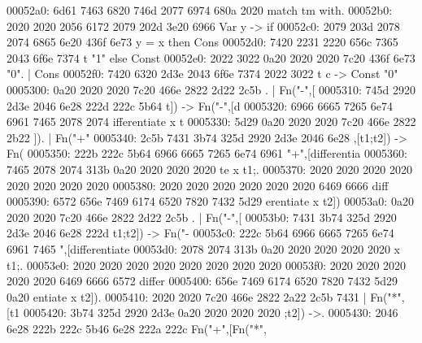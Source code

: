 \begin{bo
00010e0: 7865 647d 5c62 6567 696e 7b76 6572 6261  xed}
\begin{verba
00010f0: 7469 6d7d 0a20 2023 7479 7065 2074 6572  tim}
\begin{
0001c40: 7665 7262 6174 696d 7d0a 2020 236c 6574  verbatim}
\begin{boxe
00027a0: 647d 5c62 6567 696e 7b76 6572 6261 7469  d}
\begin{verbati
00027b0: 6d7d 0a20 2023 6c65 7420 696e 6669 7865  m}
\begin{v
0002c60: 6572 6261 7469 6d7d 0a20 2023 6c65 7420  erbatim}
\begin{
0002dc0: 7665 7262 6174 696d 7d0a 2020 236c 6574  verbatim}
\begin{boxed
0002f30: 7d5c 6265 6769 6e7b 7665 7262 6174 696d  }
\begin{verbatim
0002f40: 7d0a 2020 236c 6574 2068 6428 683a 3a74  }
\begin{v
0003e60: 6572 6261 7469 6d7d 0a20 2023 236f 7065  erbatim}
\begin{boxed
00042b0: 7d5c 6265 6769 6e7b 7665 7262 6174 696d  }
\begin{verbatim
00042c0: 7d0a 2020 2328 782c 7429 3b3b 0a20 202d  }
\begin{boxed}
\begin{boxed}
00052a0: 6d61 7463 6820 746d 2077 6974 680a 2020  match tm with.  
00052b0: 2020 2020 2056 6172 2079 202d 3e20 6966       Var y -> if
00052c0: 2079 203d 2078 2074 6865 6e20 436f 6e73   y = x then Cons
00052d0: 7420 2231 2220 656c 7365 2043 6f6e 7374  t "1" else Const
00052e0: 2022 3022 0a20 2020 2020 7c20 436f 6e73   "0".     | Cons
00052f0: 7420 6320 2d3e 2043 6f6e 7374 2022 3022  t c -> Const "0"
0005300: 0a20 2020 2020 7c20 466e 2822 2d22 2c5b  .     | Fn("-",[
0005310: 745d 2920 2d3e 2046 6e28 222d 222c 5b64  t]) -> Fn("-",[d
0005320: 6966 6665 7265 6e74 6961 7465 2078 2074  ifferentiate x t
0005330: 5d29 0a20 2020 2020 7c20 466e 2822 2b22  ]).     | Fn("+"
0005340: 2c5b 7431 3b74 325d 2920 2d3e 2046 6e28  ,[t1;t2]) -> Fn(
0005350: 222b 222c 5b64 6966 6665 7265 6e74 6961  "+",[differentia
0005360: 7465 2078 2074 313b 0a20 2020 2020 2020  te x t1;.       
0005370: 2020 2020 2020 2020 2020 2020 2020 2020                  
0005380: 2020 2020 2020 2020 2020 2020 6469 6666              diff
0005390: 6572 656e 7469 6174 6520 7820 7432 5d29  erentiate x t2])
00053a0: 0a20 2020 2020 7c20 466e 2822 2d22 2c5b  .     | Fn("-",[
00053b0: 7431 3b74 325d 2920 2d3e 2046 6e28 222d  t1;t2]) -> Fn("-
00053c0: 222c 5b64 6966 6665 7265 6e74 6961 7465  ",[differentiate
00053d0: 2078 2074 313b 0a20 2020 2020 2020 2020   x t1;.         
00053e0: 2020 2020 2020 2020 2020 2020 2020 2020                  
00053f0: 2020 2020 2020 2020 2020 6469 6666 6572            differ
0005400: 656e 7469 6174 6520 7820 7432 5d29 0a20  entiate x t2]). 
0005410: 2020 2020 7c20 466e 2822 2a22 2c5b 7431      | Fn("*",[t1
0005420: 3b74 325d 2920 2d3e 0a20 2020 2020 2020  ;t2]) ->.       
0005430: 2046 6e28 222b 222c 5b46 6e28 222a 222c   Fn("+",[Fn("*",

\end{boxed}
\end{boxed}
\end{verbatim
00042c0: 7d0a 2020 2328 782c 7429 3b3b 0a20 202d  }
\end{boxed
00042b0: 7d5c 6265 6769 6e7b 7665 7262 6174 696d  }
\end{v
0003e60: 6572 6261 7469 6d7d 0a20 2023 236f 7065  erbatim}
\end{verbatim
0002f40: 7d0a 2020 236c 6574 2068 6428 683a 3a74  }
\end{boxed
0002f30: 7d5c 6265 6769 6e7b 7665 7262 6174 696d  }
\end{
0002dc0: 7665 7262 6174 696d 7d0a 2020 236c 6574  verbatim}
\end{v
0002c60: 6572 6261 7469 6d7d 0a20 2023 6c65 7420  erbatim}
\end{verbati
00027b0: 6d7d 0a20 2023 6c65 7420 696e 6669 7865  m}
\end{boxe
00027a0: 647d 5c62 6567 696e 7b76 6572 6261 7469  d}
\end{
0001c40: 7665 7262 6174 696d 7d0a 2020 236c 6574  verbatim}
\end{verba
00010f0: 7469 6d7d 0a20 2023 7479 7065 2074 6572  tim}
\end{bo
00010e0: 7865 647d 5c62 6567 696e 7b76 6572 6261  xed}
